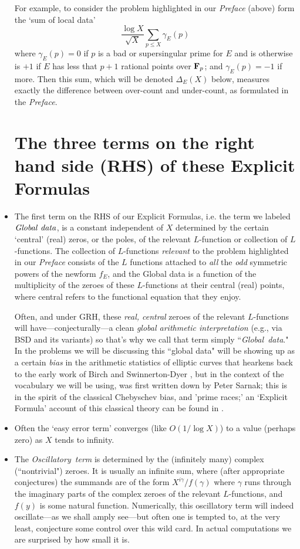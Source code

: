 \documentclass[11pt]{article}
\theoremstyle{plain}
\theoremstyle{definition}
\numberwithin{equation}{section}
\numberwithin{figure}{section}
\numberwithin{table}{section}
\begin{document}
\begin{itemize}
 For example, to consider  the problem highlighted in our {\it Preface} (above) form  the `sum of local data'
  $${\frac{\log X}{{\sqrt X}}}\sum_{p\le X}\gamma_E(p)$$  where $\gamma_E(p)=0$ if $p$ is a bad or supersingular prime for $E$ and is otherwise is $+1$ if $E$ has less that $p+1$ rational points over ${\bf F}_p$; and $\gamma_E(p) = -1$ if more.  Then this sum, which will be denoted $\Delta_E(X)$ below, measures exactly the difference between over-count and under-count, as formulated in the {\it Preface}.\vskip10pt
\section{ The three terms on the right hand side (RHS)  of these Explicit Formulas}
  \vskip10pt
\item The first  term on the RHS of our Explicit Formulas, i.e. the term we labeled ${\rm{\it Global\ data}}$, is a constant independent of $X$   determined by the certain `central'  (real)  zeros, or the poles, of the relevant $L$-function or collection of $L$-functions. The   collection of $L$-functions {\it relevant} to the problem highlighted in our {\it Preface} consists of  the $L$ functions attached to {\it all}  the {\it odd} symmetric powers of the newform $f_E$, and the Global data is a function of the multiplicity of the zeroes of these $L$-functions at their central (real) points, where central refers to the functional equation that they enjoy.

Often, and under GRH, these {\it real, central} zeroes of the relevant $L$-functions will have---conjecturally---a clean {\it global arithmetic interpretation} (e.g., via BSD and its  variants) so that's why we call  that term simply  ``{\rm{\it Global\ data}}."  In the problems we will be discussing this ``global data" will be showing up as a certain {\it bias} in the arithmetic statistics of elliptic curves that hearkens back to the early work of Birch and Swinnerton-Dyer \cite{}, but in the context of the vocabulary we will be using, was  first written down by Peter Sarnak; this is in the spirit of the classical Chebyschev bias, and 'prime races;' an `Explicit Formula' account of this classical theory can be found in {\cite{GM}}.
\item Often the
`easy error term' converges (like $O(1/
\log{X})$) to a value  (perhaps zero) as $X$ tends to infinity.
\item The {\rm{\it  Oscillatory\ term}} is determined by the (infinitely many) complex (``nontrivial") zeroes. It is usually  an infinite sum, where  (after appropriate conjectures) the summands are of the form  $X^{i\gamma}/f(\gamma)$ where $\gamma$ runs through the imaginary parts of the complex zeroes of the relevant $L$-functions, and $f(y)$ is some natural function.  Numerically, this oscillatory term will indeed oscillate---as we shall amply see---but often one  is tempted to, at the very least, conjecture some control over this wild card.  In actual computations we are surprised by  how small it is.\end{itemize}
\end{document}
